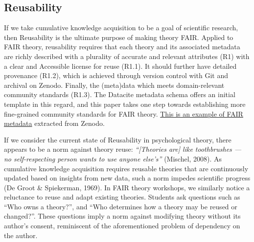 \documentclass[
  man, noextraspace,floatsintext]{apa7}
\begin{document}
\subsection{Reusability}\label{reusability}

If we take cumulative knowledge acquisition to be a goal of scientific research, then Reusability is the ultimate purpose of making theory FAIR.
Applied to FAIR theory, reusability requires that each theory and its associated metadata are richly described with a plurality of accurate and relevant attributes (R1) with a clear and Accessible license for reuse (R1.1).
It should further have detailed provenance (R1.2),
which is achieved through version control with Git and archival on Zenodo.
Finally, the (meta)data which meets domain-relevant community standards (R1.3).
The Datacite metadata schema offers an initial template in this regard,
and this paper takes one step towards establishing more fine-grained community standards for FAIR theory.
\href{https://raw.githubusercontent.com/cjvanlissa/fair_theory/refs/heads/main/example_metadata.json}{This is an example of FAIR metadata} extracted from Zenodo.

If we consider the current state of Reusability in psychological theory, there appears to be a norm against theory reuse:
\emph{``{[}Theories are{]} like toothbrushes --- no self-respecting person wants to use anyone else's''} (Mischel, 2008).
As cumulative knowledge acquisition requires reusable theories that are continuously updated based on insights from new data, such a norm impedes scientific progress (De Groot \& Spiekerman, 1969).
In FAIR theory workshops, we similarly notice a reluctance to reuse and adapt existing theories.
Students ask questions such as ``Who owns a theory?'',
and ``Who determines how a theory may be reused or changed?''.
These questions imply a norm against modifying theory without its author's consent, reminiscent of the aforementioned problem of dependency on the author.
\end{document}

